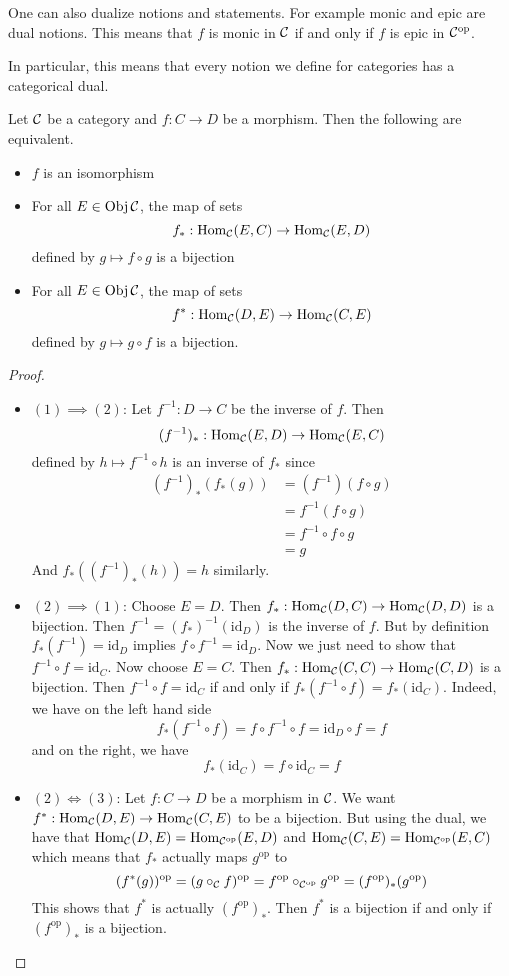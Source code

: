 \documentclass[a4paper]{article}
\begin{document}
One can also dualize notions and statements. For example monic and epic are dual notions. This means that $f$ is monic in $\mathcal{C}$ if and only if $f$ is epic in $\mathcal{C}^\text{op}$. 

In particular, this means that every notion we define for categories has a categorical dual. 

\begin{lmm}{}{} Let $\mathcal{C}$ be a category and $f:C\to D$ be a morphism. Then the following are equivalent. 
\begin{itemize}
\item $f$ is an isomorphism
\item For all $E\in\operatorname{Obj}\mathcal{C}$, the map of sets $$f_\ast:\operatorname{Hom}_{\mathcal{C}}(E,C)\to\operatorname{Hom}_{\mathcal{C}}(E,D)$$ defined by $g\mapsto f\circ g$ is a bijection
\item For all $E\in\operatorname{Obj}\mathcal{C}$, the map of sets $$f^\ast:\operatorname{Hom}_{\mathcal{C}}(D,E)\to\operatorname{Hom}_{\mathcal{C}}(C,E)$$ defined by $g\mapsto g\circ f$ is a bijection. 
\end{itemize} \tcbline
\begin{proof}~\\
\begin{itemize}
\item $(1)\implies(2)$: Let $f^{-1}:D\to C$ be the inverse of $f$. Then $$(f^{-1})_\ast:\operatorname{Hom}_{\mathcal{C}}(E,D)\to\operatorname{Hom}_{\mathcal{C}}(E,C)$$ defined by $h\mapsto f^{-1}\circ h$ is an inverse of $f_\ast$ since 
\begin{align*}
(f^{-1})_\ast(f_\ast(g))&=(f^{-1})(f\circ g)\\
&=f^{-1}(f\circ g)\\
&=f^{-1}\circ f\circ g\tag{Associativity of morphisms}\\
&=g
\end{align*}
And $f_\ast((f^{-1})_\ast(h))=h$ similarly. 
\item $(2)\implies(1)$: Choose $E=D$. Then $f_\ast:\operatorname{Hom}_{\mathcal{C}}(D,C)\to\operatorname{Hom}_{\mathcal{C}}(D,D)$ is a bijection. Then $f^{-1}=(f_\ast)^{-1}(\text{id}_D)$ is the inverse of $f$. But by definition $f_\ast(f^{-1})=\text{id}_D$ implies $f\circ f^{-1}=\text{id}_D$. Now we just need to show that $f^{-1}\circ f=\text{id}_C$. Now choose $E=C$. Then $f_\ast:\operatorname{Hom}_{\mathcal{C}}(C,C)\to\operatorname{Hom}_{\mathcal{C}}(C,D)$ is a bijection. Then $f^{-1}\circ f=\text{id}_C$ if and only if $f_\ast(f^{-1}\circ f)=f_\ast(\text{id}_C)$. Indeed, we have on the left hand side $$f_\ast(f^{-1}\circ f)=f\circ f^{-1}\circ f=\text{id}_D\circ f=f$$ and on the right, we have $$f_\ast(\text{id}_C)=f\circ \text{id}_C=f$$
\item $(2)\iff(3)$: Let $f:C\to D$ be a morphism in $\mathcal{C}$. We want $f^\ast:\operatorname{Hom}_{\mathcal{C}}(D,E)\to\operatorname{Hom}_{\mathcal{C}}(C,E)$ to be a bijection. But using the dual, we have that $\operatorname{Hom}_{\mathcal{C}}(D,E)=\operatorname{Hom}_{\mathcal{C}^{\text{op}}}(E,D)$ and $\operatorname{Hom}_{\mathcal{C}}(C,E)=\operatorname{Hom}_{\mathcal{C}^{\text{op}}}(E,C)$ which means that $f_\ast$ actually maps $g^{\text{op}}$ to $$(f^\ast(g))^{\text{op}}=(g\circ_{\mathcal{C}} f)^{\text{op}}=f^{\text{op}}\circ_{\mathcal{C}^{\text{op}}}g^{\text{op}}=(f^{\text{op}})_\ast(g^{\text{op}})$$ This shows that $f^\ast$ is actually $(f^{\text{op}})_\ast$. Then $f^\ast$ is a bijection if and only if $(f^{\text{op}})_\ast$ is a bijection. 
\end{itemize}
\end{proof}
\end{lmm}
\end{document}

